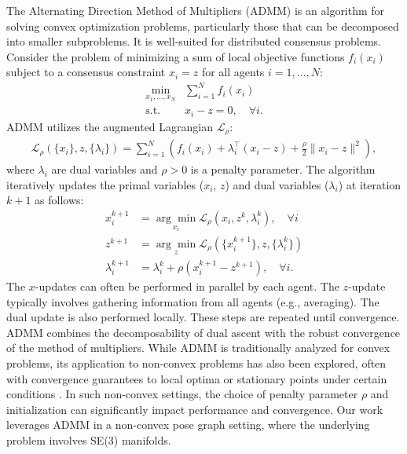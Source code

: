 The Alternating Direction Method of Multipliers (ADMM) \cite{Boyd2011} is an algorithm for solving convex optimization problems, particularly those that can be decomposed into smaller subproblems. It is well-suited for distributed consensus problems. Consider the problem of minimizing a sum of local objective functions $f_i(x_i)$ subject to a consensus constraint $x_i = z$ for all agents $i=1, \dots, N$:
\begin{equation}
\begin{aligned}
\min_{x_1, \dots, x_N} & \sum_{i=1}^N f_i(x_i) \\
\text{s.t.} \quad & x_i - z = 0, \quad \forall i.
\label{eq:admm_consensus_problem_prelim}
\end{aligned}
\end{equation}
ADMM utilizes the augmented Lagrangian ${\mathcal{L}}_{\rho}$:
\begin{equation}
\begin{aligned}
{\mathcal{L}}_{\rho}(\{x_i\}, z, \{\lambda_i\}) = \sum_{i=1}^N \left( f_i(x_i) + \lambda_i^{\top} (x_i - z) + \frac{\rho}{2} \|x_i - z\|^2 \right),
\label{eq:admm_augmented_lagrangian_prelim}
\end{aligned}
\end{equation}
where $\lambda_i$ are dual variables and $\rho > 0$ is a penalty parameter. The algorithm iteratively updates the primal variables ($x_i$, $z$) and dual variables ($\lambda_i$) at iteration $k+1$ as follows:
\begin{equation}
\begin{aligned}
x_i^{k+1} &= \underset{x_i}{\arg\min} {\mathcal{L}}_{\rho}(x_i, z^k, \lambda_i^k), \quad \forall i \\
z^{k+1} &= \underset{z}{\arg\min} {\mathcal{L}}_{\rho}(\{x_i^{k+1}\}, z, \{\lambda_i^k\}) \\
\lambda_i^{k+1} &= \lambda_i^k + \rho (x_i^{k+1} - z^{k+1}), \quad \forall i.
\label{eq:admm_updates_prelim}
\end{aligned}
\end{equation}
The $x$-updates can often be performed in parallel by each agent. The $z$-update typically involves gathering information from all agents (e.g., averaging). The dual update is also performed locally. These steps are repeated until convergence. ADMM combines the decomposability of dual ascent with the robust convergence of the method of multipliers.
While ADMM is traditionally analyzed for convex problems, its application to non-convex problems has also been explored, often with convergence guarantees to local optima or stationary points under certain conditions \cite{Hong2016, Wang2019}. In such non-convex settings, the choice of penalty parameter $\rho$ and initialization can significantly impact performance and convergence. Our work leverages ADMM in a non-convex pose graph setting, where the underlying problem involves SE(3) manifolds.
